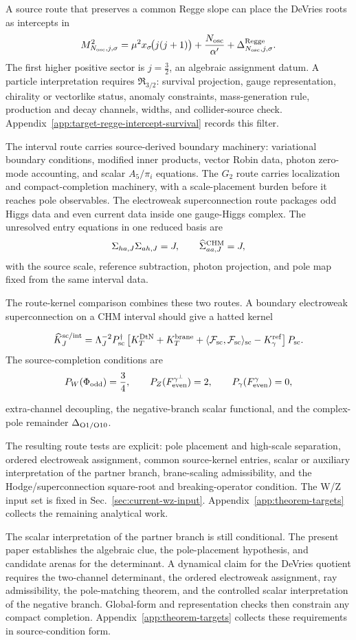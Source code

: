 A source route that preserves a common Regge slope can place the DeVries roots
as intercepts in
\[
  M^2_{N_{\rm osc},j,\sigma}
  =
  \mu^2x_\sigma\!\big(j(j+1)\big)
  +\frac{N_{\rm osc}}{\alpha'}
  +\Delta^{\rm Regge}_{N_{\rm osc},j,\sigma}.
\]
The first higher positive sector is \(j=\tfrac32\), an algebraic assignment
datum.  A particle interpretation requires \(\mathfrak R_{3/2}\):
survival projection, gauge representation, chirality or vectorlike status,
anomaly constraints, mass-generation rule, production and decay channels, widths,
and collider-source check.  Appendix~\ref{app:target-regge-intercept-survival}
records this filter.

The interval route carries source-derived boundary machinery: variational
boundary conditions, modified inner products, vector Robin data, photon
zero-mode accounting, and scalar \(A_5/\pi_i\) equations.  The \(G_2\) route
carries localization and compact-completion machinery, with a scale-placement
burden before it reaches pole observables.  The electroweak superconnection
route packages odd Higgs data and even current data inside one gauge-Higgs
complex.  The unresolved entry equations in one reduced basis are
\[
  \Sigma_{ha,J}\Sigma_{ah,J}=J,
  \qquad
  \widehat\Sigma_{aa,J}^{\rm CHM}=J,
\]
with the source scale, reference subtraction, photon projection, and pole map
fixed from the same interval data.

The route-kernel comparison combines these two routes.  A boundary electroweak
superconnection on a CHM interval should give a hatted kernel
\begin{widetext}
\[
  \widehat K_J^{\rm sc/int}
  =
  \Lambda_J^{-2}P_{\rm sc}^\dagger
  \left[
  K_T^{\rm DtN}+K_T^{\rm brane}
  +\langle\mathcal F_{\rm sc},\mathcal F_{\rm sc}\rangle_{\rm sc}
  -K_\gamma^{\rm ref}
  \right]P_{\rm sc}.
\]
The source-completion conditions are
\[
  P_W(\Phi_{\rm odd})=\frac34,\qquad
  P_Z(F_{\rm even}^{\gamma^\perp})=2,\qquad
  P_\gamma(F_{\rm even}^{\gamma})=0,
\]
\end{widetext}
extra-channel decoupling, the negative-branch scalar functional, and the
complex-pole remainder \(\Delta_{\rm O1/O10}\).

The resulting route tests are explicit: pole placement and high-scale
separation, ordered electroweak assignment, common source-kernel entries,
scalar or auxiliary interpretation of the partner branch, brane-scaling
admissibility, and the Hodge/superconnection square-root and breaking-operator
condition.  The W/Z input set is fixed in Sec.~\ref{sec:current-wz-input}.
Appendix~\ref{app:theorem-targets} collects the remaining analytical work.

The scalar interpretation of the partner branch is still conditional.  The
present paper establishes the algebraic clue, the pole-placement
hypothesis, and candidate arenas for the determinant.  A dynamical claim
for the DeVries quotient requires the two-channel determinant, the ordered
electroweak assignment, ray admissibility, the pole-matching theorem, and the
controlled scalar interpretation of the negative branch.  Global-form and
representation checks then constrain any compact completion.  Appendix~\ref{app:theorem-targets}
collects these requirements in source-condition form.
